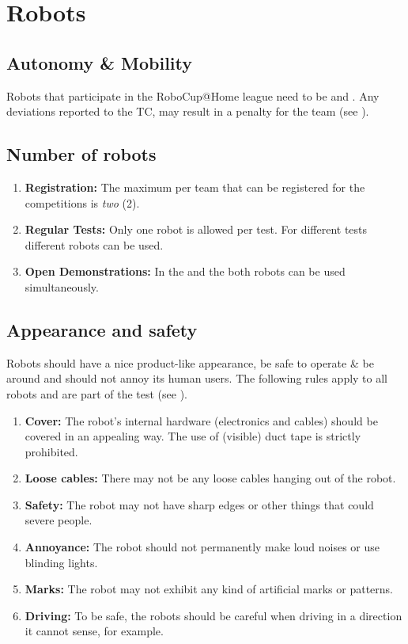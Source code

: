 \section{Robots}
\label{rule:robots}

\subsection{Autonomy \& Mobility}
Robots that participate in the RoboCup@Home league need to be  and . Any deviations reported to the TC, may result in a penalty for the team (see ).

\subsection{Number of robots}
\label{rule:robots_number}

\begin{enumerate}
	\item \textbf{Registration:} The maximum  per team that can be registered for the competitions is \emph{two} (2).
	\item \textbf{Regular Tests:} Only one robot is allowed per test. For different tests different robots can be used.
	\item \textbf{Open Demonstrations:} In the  and the  both robots can be used simultaneously.
\end{enumerate}

\subsection{Appearance and safety}
\label{rule:robot_appearance}

Robots should have a nice product-like appearance, be safe to operate \& be around and should not annoy its human users. The following rules apply to all robots and are part of the  test (see ). 
\begin{enumerate}
	\item \textbf{Cover:} The robot's internal hardware (electronics and cables) should be covered in an appealing way. The use of (visible) duct tape is strictly prohibited.
	\item \textbf{Loose cables:} There may not be any loose cables hanging out of the robot. 
	\item \textbf{Safety:} The robot may not have sharp edges or other things that could severe people.
	\item \textbf{Annoyance:} The robot should not permanently make loud noises or use blinding lights.
	\item \textbf{Marks:} The robot may not exhibit any kind of artificial marks or patterns.
	\item \textbf{Driving:} To be safe, the robots should be careful when driving in a direction it cannot sense, for example. 
\end{enumerate}







